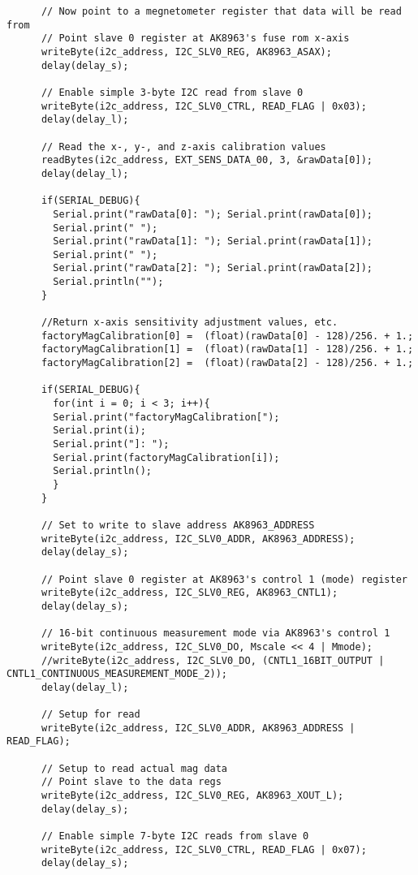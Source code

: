 \begin{lstlisting}
	  // Now point to a megnetometer register that data will be read from
	  // Point slave 0 register at AK8963's fuse rom x-axis
	  writeByte(i2c_address, I2C_SLV0_REG, AK8963_ASAX);
	  delay(delay_s);

	  // Enable simple 3-byte I2C read from slave 0
	  writeByte(i2c_address, I2C_SLV0_CTRL, READ_FLAG | 0x03);
	  delay(delay_l);

	  // Read the x-, y-, and z-axis calibration values
	  readBytes(i2c_address, EXT_SENS_DATA_00, 3, &rawData[0]);
	  delay(delay_l);

	  if(SERIAL_DEBUG){
	    Serial.print("rawData[0]: "); Serial.print(rawData[0]);
	    Serial.print(" ");
	    Serial.print("rawData[1]: "); Serial.print(rawData[1]);
	    Serial.print(" ");
	    Serial.print("rawData[2]: "); Serial.print(rawData[2]);
	    Serial.println("");
	  }

	  //Return x-axis sensitivity adjustment values, etc.
	  factoryMagCalibration[0] =  (float)(rawData[0] - 128)/256. + 1.;
	  factoryMagCalibration[1] =  (float)(rawData[1] - 128)/256. + 1.;
	  factoryMagCalibration[2] =  (float)(rawData[2] - 128)/256. + 1.;

	  if(SERIAL_DEBUG){
	    for(int i = 0; i < 3; i++){
	    Serial.print("factoryMagCalibration[");
	    Serial.print(i);
	    Serial.print("]: ");
	    Serial.print(factoryMagCalibration[i]);
	    Serial.println();
	    }
	  }

	  // Set to write to slave address AK8963_ADDRESS
	  writeByte(i2c_address, I2C_SLV0_ADDR, AK8963_ADDRESS);
	  delay(delay_s);
	  
	  // Point slave 0 register at AK8963's control 1 (mode) register
	  writeByte(i2c_address, I2C_SLV0_REG, AK8963_CNTL1);
	  delay(delay_s);

	  // 16-bit continuous measurement mode via AK8963's control 1
	  writeByte(i2c_address, I2C_SLV0_DO, Mscale << 4 | Mmode);
	  //writeByte(i2c_address, I2C_SLV0_DO, (CNTL1_16BIT_OUTPUT | CNTL1_CONTINUOUS_MEASUREMENT_MODE_2));
	  delay(delay_l);

	  // Setup for read
	  writeByte(i2c_address, I2C_SLV0_ADDR, AK8963_ADDRESS | READ_FLAG);

	  // Setup to read actual mag data
	  // Point slave to the data regs
	  writeByte(i2c_address, I2C_SLV0_REG, AK8963_XOUT_L);
	  delay(delay_s);

	  // Enable simple 7-byte I2C reads from slave 0
	  writeByte(i2c_address, I2C_SLV0_CTRL, READ_FLAG | 0x07);
	  delay(delay_s);


\end{lstlisting}
